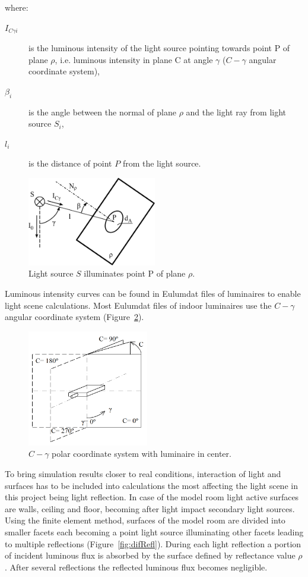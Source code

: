 where:
\begin{description}
	\item[$I_{C \gamma i}$] is the luminous intensity of the light source pointing towards point P of plane $\rho$, i.e. luminous intensity in plane C at angle $\gamma$ ($C-\gamma$ angular coordinate system),
	\item[$\beta_{i}$] is the angle between the normal of plane $\rho$ and the light ray from light source $S_{i}$,
	\item[$l_{i}$] is the distance of point $P$ from the light source.
\end{description}

\begin{figure}[htb]
  \centering
  \includegraphics[width=160pt]{315_osvetlenost_bodovym_zdrojem_2}
  \caption{Light source $S$ illuminates point P of plane $\rho$.}
  \label{fig:osv}
\end{figure}

Luminous intensity curves can be found in Eulumdat files of luminaires to enable light scene calculations. Most Eulumdat files of indoor luminaires use the $C-\gamma$ angular coordinate system (Figure~\ref{fig:cgamma}).

\begin{figure}[htb]
  \centering
  \includegraphics[width=150pt]{Cgama}
  \caption{$C-\gamma$ polar coordinate system with luminaire in center.}
  \label{fig:cgamma}
\end{figure}

To bring simulation results closer to real conditions, interaction of light and surfaces has to be included into calculations the most affecting the light scene in this project being light reflection. In case of the model room light active surfaces are walls, ceiling and floor, becoming after light impact secondary light sources. Using the finite element method, surfaces of the model room are divided into smaller facets each becoming a point light source illuminating other facets leading to multiple reflections (Figure~\ref{fig:difRefl}). During each light reflection a portion of incident luminous flux is absorbed by the surface defined by reflectance value $\rho$. After several reflections the reflected luminous flux becomes negligible.

